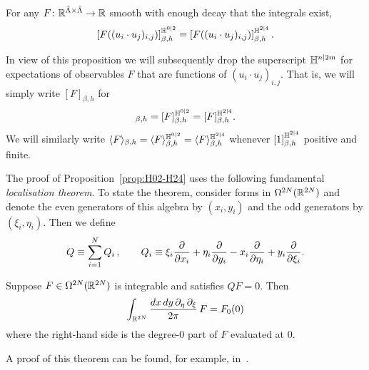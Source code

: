\documentclass[11pt]{amsart}
\numberwithin{equation}{section}
\numberwithin{theorem}{section}
\newcommand{\cb}[1]{\left[#1\right ]} %
\begin{document}
\begin{proposition}
  \label{prop:H02-H24}
  For any $F\colon \mathbb{R}^{\tilde\Lambda\times\tilde\Lambda}\to \mathbb{R}$ smooth
  with enough decay that the integrals exist, 
  \begin{equation}
    \label{eq:H02-H24}
    \cb{ F((u_{i}\cdot u_{j})_{i,j})}_{\beta,h}^{\HH^{0|2}} 
    =     
    \cb{ F((u_{i}\cdot u_{j})_{i,j})}_{\beta,h}^{\HH^{2|4}}.
  \end{equation}
\end{proposition}

In view of this proposition we will subsequently drop the superscript
$\mathbb{H}^{n|2m}$ for expectations of observables $F$ that are functions of
$(u_i\cdot u_j)_{i,j}$. That is, we will simply write $\cb{F}_{\beta,h}$
for 
\begin{equation}
  [F]_{\beta,h} 
  =[F]_{\beta,h}^{\HH^{0|2}}
  =[F]_{\beta,h}^{\HH^{2|4}}.
\end{equation}
We will similarly write
$\langle F \rangle_{\beta,h}=\langle F \rangle_{\beta,h}^{\mathbb{H}^{0|2}}=\langle F \rangle_{\beta,h}^{\mathbb{H}^{2|4}}$
whenever $\cb{1}_{\beta,h}^{\HH^{2|4}}$ positive and finite.


The proof of Proposition~\ref{prop:H02-H24} uses the following
fundamental \emph{localisation theorem}.  To state the theorem,
consider forms in $\Omega^{2N}(\mathbb{R}^{2N})$ and denote the even
generators of this algebra by $(x_i,y_i)$ and the odd generators by
$(\xi_i,\eta_i)$. Then we define
\begin{equation}
  Q \equiv \sum_{i=1}^{N} Q_i\,,
  \qquad 
  Q_i \equiv \xi_i \frac{\partial }{\partial x_i} + \eta_i \frac{\partial }{\partial y_i} - x_i\frac{\partial }{\partial \eta_i} + y_i \frac{\partial }{\partial \xi_i}.
\end{equation}

\begin{theorem} \label{thm:F0}
  Suppose $F \in\Omega^{2N}(\mathbb{R}^{2N})$ is integrable and satisfies $QF=0$. Then
  \begin{equation}
    \int_{\mathbb{R}^{2N}} \frac{dx\, dy\, \partial_{\eta}\, \partial_{\xi}}{2\pi}\, F = F_0(0)
  \end{equation}
  where the right-hand side is the degree-$0$ part of $F$ evaluated at $0$.
\end{theorem}
A proof of this theorem can be found, for example, in~\cite[Appendix~B]{1904.01532}.
\end{document}
